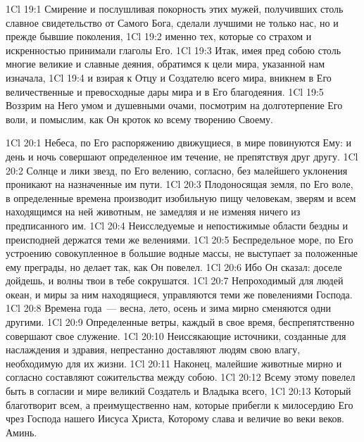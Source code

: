 \vs 1Cl 19:1
Смирение и послушливая
покорность этих мужей, получивших столь славное свидетельство от Самого Бога,
сделали лучшими не только нас, но и прежде бывшие поколения,
\vs 1Cl 19:2
именно тех, которые со
страхом и искренностью принимали глаголы Его.
\vs 1Cl 19:3
Итак, имея пред собою
столь многие великие и славные деяния, обратимся к цели мира, указанной нам
изначала,
\vs 1Cl 19:4
и взирая к Отцу и
Создателю всего мира, вникнем в Его величественные и превосходные дары мира и
в Его благодеяния.
\vs 1Cl 19:5
Воззрим на Него умом и
душевными очами, посмотрим на долготерпение Его воли, и помыслим, как Он
кроток ко всему творению Своему.

\vs 1Cl 20:1
Небеса, по Его
распоряжению движущиеся, в мире повинуются Ему: и день и ночь совершают
определенное им течение, не препятствуя друг другу.
\vs 1Cl 20:2
Солнце и лики звезд, по
Его велению, согласно, без малейшего уклонения проникают на назначенные им
пути.
\vs 1Cl 20:3
Плодоносящая земля, по Его
воле, в определенные времена производит изобильную пищу человекам, зверям и
всем находящимся на ней животным, не замедляя и не изменяя ничего из
предписанного им.
\vs 1Cl 20:4
Неисследуемые и
непостижимые области бездны и преисподней держатся теми же велениями.
\vs 1Cl 20:5
Беспредельное море, по Его
устроению совокупленное в большие водные массы, не выступает за положенные ему
преграды, но делает так, как Он повелел.
\vs 1Cl 20:6
Ибо Он сказал: доселе
дойдешь, и волны твои в тебе сокрушатся.
\vs 1Cl 20:7
Непроходимый для людей
океан, и миры за ним находящиеся, управляются теми же повелениями Господа.
\vs 1Cl 20:8
Времена года~--- весна,
лето, осень и зима мирно сменяются одни другими.
\vs 1Cl 20:9
Определенные ветры, каждый
в свое время, беспрепятственно совершают свое служение.
\vs 1Cl 20:10
Неиссякающие источники,
созданные для наслаждения и здравия, непрестанно доставляют людям свою влагу,
необходимую для их жизни.
\vs 1Cl 20:11
Наконец, малейшие
животные мирно и согласно составляют сожительства между собою.
\vs 1Cl 20:12
Всему этому повелел быть
в согласии и мире великий Создатель и Владыка всего,
\vs 1Cl 20:13
Который благотворит всем,
а преимущественно нам, которые прибегли к милосердию Его чрез Господа нашего
Иисуса Христа, Которому слава и величие во веки веков. Аминь.

